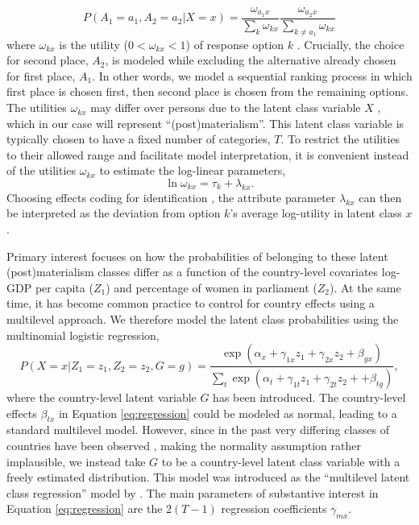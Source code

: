 \documentclass[letterpaper,12pt]{article}
\begin{document}
\citep{moors2007heterogeneity}
\begin{equation}
	P(A_1 = a_1, A_2 = a_2 | X = x) = 
		\frac{\omega_{a_1 x}}{\sum_{k} \omega_{k x}}
		\frac{\omega_{a_2 x}}{\sum_{k \neq a_1}
			\omega_{k x}}
				\label{eq:ranking}
\end{equation}
where $\omega_{k x}$ is the utility ($0<\omega_{k x}<1$) of response option $k$ \citep{mcfadden1974conditional}. Crucially, the choice for second place, $A_2$, is modeled while excluding the alternative already chosen for first place, $A_1$. In other words, we model a sequential ranking process in which first place is chosen first, then second place is chosen from the remaining options. The utilities $\omega_{kx}$ may differ over persons due to the latent class variable $X$ \citep[pp. 171--3]{bockenholt2002comparison}, which in our case will represent ``(post)materialism''. This latent class variable is typically chosen to have a fixed number of categories, $T$. To restrict the utilities to their allowed range and facilitate model interpretation, it is convenient instead of the utilities $\omega_{kx}$ to estimate the log-linear parameters,
\begin{equation}
	\ln \omega_{k x} = \tau_{k} + \lambda_{k x}.
\end{equation}
Choosing effects coding for identification \citep{vermunt2013technical},  the attribute parameter $\lambda_{k x}$ can then be interpreted as the deviation from option $k$'s average log-utility in latent class $x$.



Primary interest focuses on how the probabilities of belonging to these latent (post)materialism classes differ as a function of the country-level covariates log-GDP per capita ($Z_1$) and percentage of women in parliament ($Z_2$).  At the same time, it has become common practice to control for country effects using a multilevel approach. We therefore model the latent class probabilities using the multinomial logistic regression,
\begin{equation}
P(X = x| Z_1 = z_1, Z_2 = z_2, G = g) = \frac{\exp(\alpha_x + \gamma_{1x} z_1 +\gamma_{2x} z_2  + \beta_{gx})}
					{\sum_t \exp(\alpha_t + \gamma_{1t} z_1 +  \gamma_{2t} z_2 +  + \beta_{tg})},
					\label{eq:regression}
\end{equation}
where the country-level latent variable $G$ has been introduced. The country-level effects $\beta_{tx}$ in Equation \ref{eq:regression} could be modeled as normal, leading to a standard multilevel model. However, since in the past very differing classes of countries have been observed \citep{moors2007heterogeneity}, making the normality assumption rather implausible, we instead take $G$ to be a country-level latent class variable with a freely estimated distribution. This model was introduced as the ``multilevel latent class regression'' model by \citet{vermunt2003multilevel}.
The main parameters of substantive interest in Equation \ref{eq:regression} are the $2  (T - 1)$ regression coefficients $\gamma_{mx}$.
\end{document}

